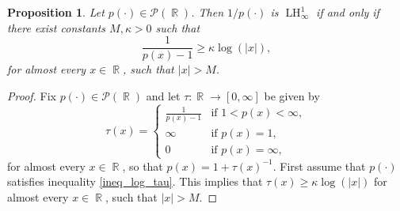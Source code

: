 \documentclass[11pt,reqno]{amsart}
\newtheorem{prop}[theorem]{Proposition}
\theoremstyle{definition}
\theoremstyle{definition}
\theoremstyle{definition}
\DeclareMathOperator{\R}{\mathbb{R}}
\newcommand{\p}{p(\cdot)}
\newcommand{\LH}{\operatorname{LH}_\infty^1}
\begin{document}
\begin{prop}\label{lemma_tau}
    Let $\p\in\mathcal{P}(\R)$. Then $1/\p$ is $\LH$ if and only if there exist constants $M,\kappa>0$ such that
    \begin{equation}\label{ineq_log_tau}
        \frac{1}{p(x)-1}\geq \kappa\log(|x|),
    \end{equation}
    for almost every $x\in\R$, such that $|x|>M$.
\end{prop}
\begin{proof}
    Fix $\p\in\mathcal{P}(\R)$ and let $\tau:\R\to [0,\infty]$ be given by
    \begin{equation*}
        \tau(x)=\begin{cases}
            \frac{1}{p(x)-1}&\text{if }1<p(x)<\infty,\\
            \infty &\text{if } p(x)=1,\\
            0  &\text{if }p(x)=\infty,
        \end{cases}
    \end{equation*}
    for almost every $x\in\R$, so that $p(x)=1+\tau(x)^{-1}$. First assume that $\p$ satisfies inequality \eqref{ineq_log_tau}. This implies that $\tau(x)\geq\kappa\log(|x|)$  for almost every $x\in\R$, such that $|x|>M$. 
    

\end{proof}
\end{document}
